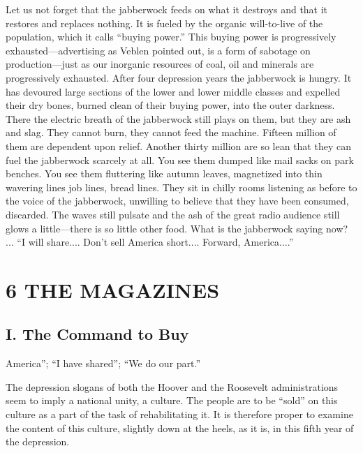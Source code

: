 \documentclass[openany,nobib]{tufte-book}
\let\oldchapter\chapter
\def\chapter{%
  \setcounter{footnote}{0}%
  \oldchapter
}
\begin{document}
Let us not forget that the jabberwock feeds on what it destroys and that
it restores and replaces nothing. It is fueled by the organic
will-to-live of the population, which it calls ``buying power.'' This
buying power is progressively exhausted---advertising as Veblen pointed
out, is a form of sabotage on production---just as our inorganic
resources of coal, oil and minerals are progressively exhausted. After
four depression years the jabberwock is hungry. It has devoured large
sections of the lower and lower middle classes and expelled their dry
bones, burned clean of their buying power, into the outer darkness.
There the electric breath of the jabberwock still plays on them, but
they are ash and slag. They cannot burn, they cannot feed the machine.
Fifteen million of them are dependent upon relief. Another thirty
million are so lean that they can fuel the jabberwock scarcely at all.
You see them dumped like mail sacks on park benches. You see them
fluttering like autumn leaves, magnetized into thin wavering lines job
lines, bread lines. They sit in chilly rooms listening as before to the
voice of the jabberwock, unwilling to believe that they have been
consumed, discarded. The waves still pulsate and the ash of the great
radio audience still glows a little---there is so little other food.
What is the jabberwock saying now? ... ``I will share.... Don't sell
America short.... Forward, America....''



\chapter[6 \hspace*{1mm} THE MAGAZINES]{6 THE MAGAZINES}

\section{I. The Command to Buy}

 America''; ``I have shared''; ``We do our part.''

The depression slogans of both the Hoover and the Roosevelt
administrations seem to imply a national unity, a culture. The people
are to be ``sold'' on this culture as a part of the task of
rehabilitating it. It is therefore proper to examine the content of this
culture, slightly down at the heels, as it is, in this fifth year of the
depression.
\end{document}
